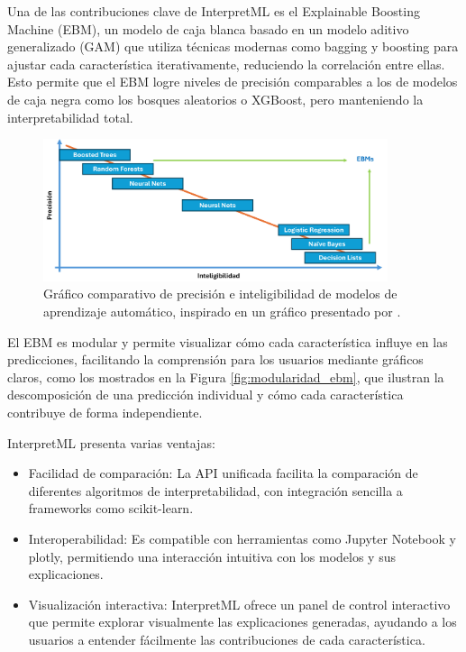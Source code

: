 Una de las contribuciones clave de InterpretML es el Explainable Boosting Machine (EBM), un modelo de caja blanca basado en un modelo aditivo generalizado (GAM) que utiliza técnicas modernas como bagging y boosting para ajustar cada característica iterativamente, reduciendo la correlación entre ellas. Esto permite que el EBM logre niveles de precisión comparables a los de modelos de caja negra como los bosques aleatorios o XGBoost, pero manteniendo la interpretabilidad total.

\begin{figure}[H]
    \centering
    \includegraphics[width=0.9\textwidth]{include/EBMs.png}
    \caption{Gráfico comparativo de precisión e inteligibilidad de modelos de aprendizaje automático, inspirado en un gráfico presentado por \cite{microsoftEBMvideo}.}
    \label{fig:EBMs}
\end{figure}

El EBM es modular y permite visualizar cómo cada característica influye en las predicciones, facilitando la comprensión para los usuarios mediante gráficos claros, como los mostrados en la Figura \ref{fig:modularidad_ebm}, que ilustran la descomposición de una predicción individual y cómo cada característica contribuye de forma independiente.

InterpretML presenta varias ventajas:
\begin{itemize}
    \item Facilidad de comparación: La API unificada facilita la comparación de diferentes algoritmos de interpretabilidad, con integración sencilla a frameworks como scikit-learn.
    \item Interoperabilidad: Es compatible con herramientas como Jupyter Notebook y plotly, permitiendo una interacción intuitiva con los modelos y sus explicaciones.
    \item Visualización interactiva: InterpretML ofrece un panel de control interactivo que permite explorar visualmente las explicaciones generadas, ayudando a los usuarios a entender fácilmente las contribuciones de cada característica.
\end{itemize}

